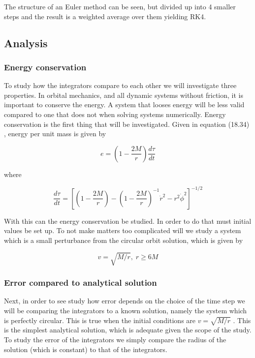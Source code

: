 The structure of an Euler method can be seen, but divided up into 4 smaller steps and the result is a weighted average over them yielding RK4. 

\subsection{Analysis}

\subsubsection{Energy conservation}
To study how the integrators compare to each other we will investigate three properties. In orbital mechanics, and all dynamic systems without friction, it is important to conserve the energy. A system that looses energy will be less valid compared to one that does not when solving systems numerically. Energy conservation is the first thing that will be investigated. Given in equation (18.34) \cite{gould_2007}, energy per unit mass is given by

\begin{equation}\label{eq:system-energy}
	e = \left(1-\frac{2M}{r}\right)\frac{d\tau}{dt}
\end{equation}

where

\begin{equation}
	\frac{d\tau}{dt} = \left[\left(1-\frac{2M}{r}\right) - \left(1-\frac{2M}{r}\right)^{-1} \dot{r}^2 - r^2 \dot{\phi}^2\right]^{-1/2}	
\end{equation}

With this can the energy conservation be studied. In order to do that must initial values be set up. To not make matters too complicated will we study a system which is a small perturbance from the circular orbit solution, which is given by 

\begin{equation}
	v = \sqrt{M/r}, \; r \geq 6M
\end{equation}

\subsubsection{Error compared to analytical solution}

Next, in order to see study how error depends on the choice of the time step we will be comparing the integrators to a known solution, namely the system which is perfectly circular. This is true when the initial conditions are $v=\sqrt{M/r}$ \cite{gould_2007}. This is the simplest analytical solution, which is adequate given the scope of the study. To study the error of the integrators we simply compare the radius of the solution (which is constant) to that of the integrators. 


